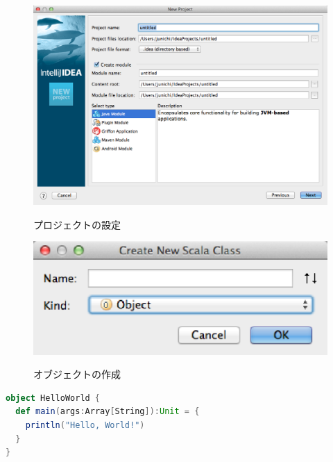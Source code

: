 \begin{figure}[h]
  \centering
  \caption{プロジェクトの設定}
  \includegraphics[scale=0.4]{hn-scala-hwg/img/new_project.eps}
  \label{fig:new_project}
\end{figure}

\begin{figure}[h]
  \centering
  \caption{オブジェクトの作成}
  \includegraphics[scale=0.4]{hn-scala-hwg/img/create_new_scala_class.eps}
  \label{fig:create_new_scala_class}
\end{figure}

\begin{lstlisting}[language=scala, label=src:helloworld, caption=HelloWorld.scala]
object HelloWorld {
  def main(args:Array[String]):Unit = {
    println("Hello, World!")
  }
}
\end{lstlisting}

